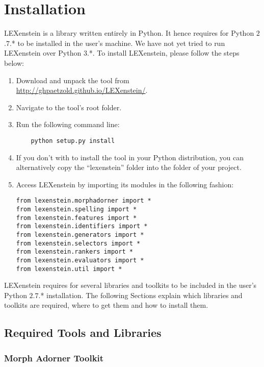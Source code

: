 \chapter{Installation}
\label{install}

LEXenstein is a library written entirely in Python. It hence requires for Python $2$.$7$.* to be installed in the user's machine. We have not yet tried to run LEXenstein over Python $3$.*. To install LEXenstein, please follow the steps below:

\begin{enumerate}
	\item Download and unpack the tool from \url{http://ghpaetzold.github.io/LEXenstein/}.
	\item Navigate to the tool's root folder.
	\item Run the following command line:
	
	\begin{lstlisting}
	python setup.py install
	\end{lstlisting}
	
	\item If you don't with to install the tool in your Python distribution, you can alternatively copy the ``lexenstein'' folder into the folder of your project.
	\item Access LEXenstein by importing its modules in the following fashion:
	\begin{lstlisting}
from lexenstein.morphadorner import *
from lexenstein.spelling import *
from lexenstein.features import *
from lexenstein.identifiers import *
from lexenstein.generators import *
from lexenstein.selectors import *
from lexenstein.rankers import *
from lexenstein.evaluators import *
from lexenstein.util import *
\end{lstlisting}
\end{enumerate}

LEXenstein requires for several libraries and toolkits to be included in the user's Python $2$.$7$.* installation. The following Sections explain which libraries and toolkits are required, where to get them and how to install them.






\section{Required Tools and Libraries}

\subsection{Morph Adorner Toolkit}

